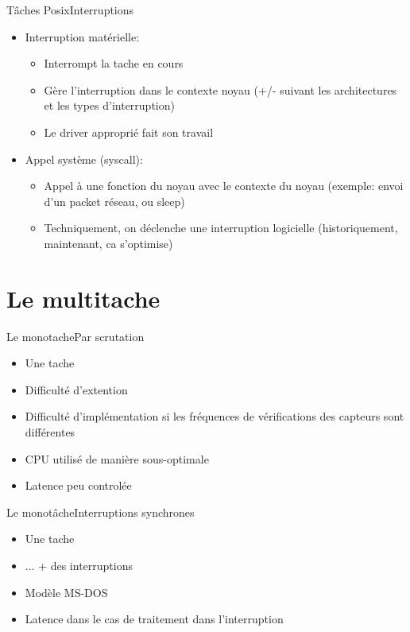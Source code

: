 \begin{frame}{Tâches Posix}{Interruptions}
  \begin{itemize}
   \item Interruption matérielle: 
   \begin{itemize}
    \item Interrompt la tache en cours
    \item Gère l'interruption dans  le contexte noyau (+/- suivant les
      architectures et les types d'interruption)
    \item Le driver approprié fait son travail
   \end{itemize}
   \item Appel système (syscall):
   \begin{itemize}
   \item  Appel à  une fonction  du noyau  avec le  contexte  du noyau
     (exemple: envoi d'un packet réseau, ou sleep)
   \item  Techniquement,  on  déclenche  une  interruption  logicielle
     (historiquement, maintenant, ca s'optimise)
   \end{itemize}
  \end{itemize}
\end{frame}

\section{Le multitache}

\begin{frame}{Le monotache}{Par scrutation} 
  \begin{itemize}
    \item Une tache
    \item Difficulté d'extention 
    \item Difficulté d'implémentation si les fréquences de vérifications des capteurs sont différentes
    \item CPU utilisé de manière sous-optimale
    \item Latence peu controlée
  \end{itemize}
\end{frame}

\begin{frame}{Le monotâche}{Interruptions synchrones}
  \begin{itemize}
    \item Une tache
    \item ... + des interruptions
    \item Modèle MS-DOS
    \item Latence dans le cas de traitement dans l'interruption
  \end{itemize}
\end{frame}


